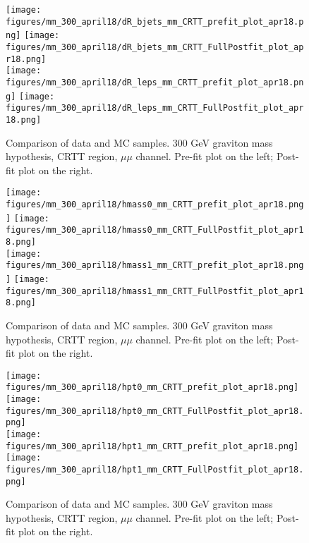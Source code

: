 \begin{figure}[H]
\begin{center}
\texttt{[image: figures/mm\_300\_april18/dR\_bjets\_mm\_CRTT\_prefit\_plot\_apr18.png]}
\texttt{[image: figures/mm\_300\_april18/dR\_bjets\_mm\_CRTT\_FullPostfit\_plot\_apr18.png]}\\
\texttt{[image: figures/mm\_300\_april18/dR\_leps\_mm\_CRTT\_prefit\_plot\_apr18.png]}
\texttt{[image: figures/mm\_300\_april18/dR\_leps\_mm\_CRTT\_FullPostfit\_plot\_apr18.png]}\\
\caption[Data-MC comparison in CRTT.]{Comparison of data and MC samples. 300 GeV graviton mass hypothesis, CRTT region, $\mu\mu$ channel. Pre-fit plot on the left; Post-fit plot on the right.}
\label{MCcomparisons_mm_low_CRTT_1}
\end{center}
\end{figure}


\begin{figure}[H]
\begin{center}
\texttt{[image: figures/mm\_300\_april18/hmass0\_mm\_CRTT\_prefit\_plot\_apr18.png]}
\texttt{[image: figures/mm\_300\_april18/hmass0\_mm\_CRTT\_FullPostfit\_plot\_apr18.png]}\\
\texttt{[image: figures/mm\_300\_april18/hmass1\_mm\_CRTT\_prefit\_plot\_apr18.png]}
\texttt{[image: figures/mm\_300\_april18/hmass1\_mm\_CRTT\_FullPostfit\_plot\_apr18.png]}\\
\caption[Data-MC comparison in CRTT.]{Comparison of data and MC samples. 300 GeV graviton mass hypothesis, CRTT region, $\mu\mu$ channel. Pre-fit plot on the left; Post-fit plot on the right.}
\label{MCcomparisons_mm_low_CRTT_2}
\end{center}
\end{figure}

\begin{figure}[H]
\begin{center}
\texttt{[image: figures/mm\_300\_april18/hpt0\_mm\_CRTT\_prefit\_plot\_apr18.png]}
\texttt{[image: figures/mm\_300\_april18/hpt0\_mm\_CRTT\_FullPostfit\_plot\_apr18.png]}\\
\texttt{[image: figures/mm\_300\_april18/hpt1\_mm\_CRTT\_prefit\_plot\_apr18.png]}
\texttt{[image: figures/mm\_300\_april18/hpt1\_mm\_CRTT\_FullPostfit\_plot\_apr18.png]}\\
\caption[Data-MC comparison in CRTT.]{Comparison of data and MC samples. 300 GeV graviton mass hypothesis, CRTT region, $\mu\mu$ channel. Pre-fit plot on the left; Post-fit plot on the right.}
\label{MCcomparisons_mm_low_CRTT_3}
\end{center}
\end{figure}


